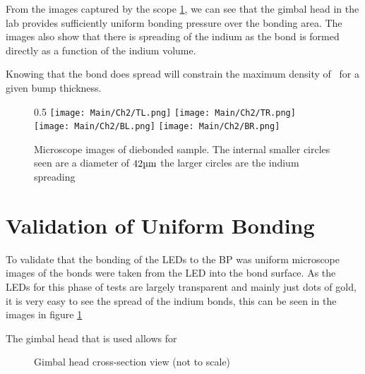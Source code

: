 From the images captured by the scope \ref{fig:microscopeIndium}, we can see that the gimbal head in the lab provides sufficiently uniform bonding pressure over the bonding area. The images also show that there is spreading of the indium as the bond is formed directly as a function of the indium volume.

Knowing that the bond does spread will constrain the maximum density of \uleds \ for a given bump thickness.

\begin{figure}{0.5\textwidth}
    \centering
    \texttt{[image: Main/Ch2/TL.png]}
    \texttt{[image: Main/Ch2/TR.png]} \\
    \texttt{[image: Main/Ch2/BL.png]}
    \texttt{[image: Main/Ch2/BR.png]}
    \caption{Microscope images of diebonded sample. The internal smaller circles seen are a diameter of $42 \um$ the larger circles are the indium spreading}
    \label{fig:microscopeIndium}
\end{figure}

\section{Validation of Uniform Bonding}
\label{sec:uniformBond}
To validate that the bonding of the LEDs to the BP was uniform microscope images of the bonds were taken from the LED into the bond surface. As the LEDs for this phase of tests are largely transparent and mainly just dots of gold, it is very easy to see the spread of the indium bonds, this can be seen in the images in figure \ref{fig:microscopeIndium}

The gimbal head that is used %
allows for

\begin{figure}
    \centering
    \caption{Gimbal head cross-section view (not to scale)}
    \label{fig:gimbal_head}
\end{figure}


